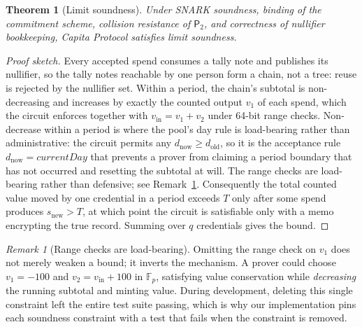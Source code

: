 \documentclass[11pt,a4paper]{article}
\theoremstyle{definition}
\theoremstyle{plain}
\newtheorem{theorem}{Theorem}
\theoremstyle{remark}
\newtheorem{remark}{Remark}
\newcommand{\PT}{\ensuremath{\mathsf{P}_2}}
\begin{document}
\begin{theorem}[Limit soundness]
Under SNARK soundness, binding of the commitment scheme, collision resistance of $\PT$, and correctness of nullifier bookkeeping, Capita Protocol satisfies limit soundness.
\end{theorem}
\begin{proof}[Proof sketch]
Every accepted spend consumes a tally note and publishes its nullifier, so the tally notes reachable by one person form a chain, not a tree: reuse is rejected by the nullifier set. Within a period, the chain's subtotal is non-decreasing and increases by exactly the counted output $v_1$ of each spend, which the circuit enforces together with $v_{\mathrm{in}} = v_1 + v_2$ under 64-bit range checks. Non-decrease within a period is where the pool's day rule is load-bearing rather than administrative: the circuit permits any $d_{\mathrm{now}} \geq d_{\mathrm{old}}$, so it is the acceptance rule $d_{\mathrm{now}} = \mathit{currentDay}$ that prevents a prover from claiming a period boundary that has not occurred and resetting the subtotal at will. The range checks are load-bearing rather than defensive; see Remark~\ref{rem:range}. Consequently the total counted value moved by one credential in a period exceeds $T$ only after some spend produces $s_{\mathrm{new}} > T$, at which point the circuit is satisfiable only with a memo encrypting the true record. Summing over $q$ credentials gives the bound.
\end{proof}

\begin{remark}[Range checks are load-bearing]
\label{rem:range}
Omitting the range check on $v_1$ does not merely weaken a bound; it inverts the mechanism. A prover could choose $v_1 = -100$ and $v_2 = v_{\mathrm{in}} + 100$ in $\mathbb{F}_p$, satisfying value conservation while \emph{decreasing} the running subtotal and minting value. During development, deleting this single constraint left the entire test suite passing, which is why our implementation pins each soundness constraint with a test that fails when the constraint is removed.
\end{remark}
\end{document}
